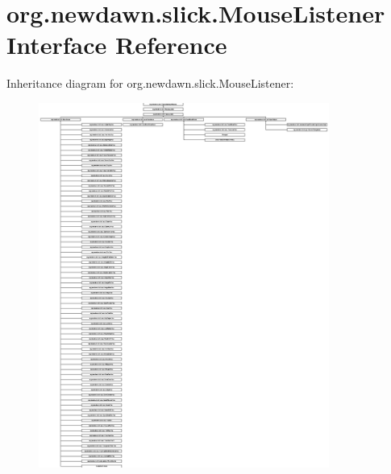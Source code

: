 \hypertarget{interfaceorg_1_1newdawn_1_1slick_1_1_mouse_listener}{}\section{org.\+newdawn.\+slick.\+Mouse\+Listener Interface Reference}
\label{interfaceorg_1_1newdawn_1_1slick_1_1_mouse_listener}
Inheritance diagram for org.\+newdawn.\+slick.\+Mouse\+Listener\+:\begin{figure}[H]
\begin{center}
\leavevmode
\includegraphics[height=12.000000cm]{interfaceorg_1_1newdawn_1_1slick_1_1_mouse_listener}
\end{center}
\end{figure}
